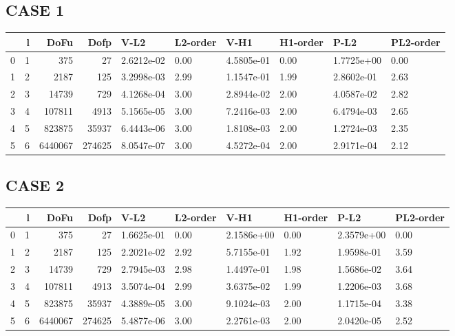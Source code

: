\documentclass[11pt]{article}
\numberwithin{equation}{section}    %
\begin{document}
\subsection*{CASE 1}

\begin{tabular}{lrrrllllll}
\hline
{} &  l &     DoFu &    Dofp &        V-L2 & L2-order &        V-H1 & H1-order &        P-L2 & PL2-order \\
\hline
\hline
0 &  1 &      375 &      27 &  2.6212e-02 &     0.00 &  4.5805e-01 &     0.00 &  1.7725e+00 &      0.00 \\
1 &  2 &     2187 &     125 &  3.2998e-03 &     2.99 &  1.1547e-01 &     1.99 &  2.8602e-01 &      2.63 \\
2 &  3 &    14739 &     729 &  4.1268e-04 &     3.00 &  2.8944e-02 &     2.00 &  4.0587e-02 &      2.82 \\
3 &  4 &   107811 &    4913 &  5.1565e-05 &     3.00 &  7.2416e-03 &     2.00 &  6.4794e-03 &      2.65 \\
4 &  5 &   823875 &   35937 &  6.4443e-06 &     3.00 &  1.8108e-03 &     2.00 &  1.2724e-03 &      2.35 \\
5 &  6 &  6440067 &  274625 &  8.0547e-07 &     3.00 &  4.5272e-04 &     2.00 &  2.9171e-04 &      2.12 \\
\hline
\end{tabular}




\subsection*{CASE 2}

\begin{tabular}{lrrrllllll}
\hline
{} &  l &     DoFu &    Dofp &        V-L2 & L2-order &        V-H1 & H1-order &        P-L2 & PL2-order \\
\hline
0 &  1 &      375 &      27 &  1.6625e-01 &     0.00 &  2.1586e+00 &     0.00 &  2.3579e+00 &      0.00 \\
1 &  2 &     2187 &     125 &  2.2021e-02 &     2.92 &  5.7155e-01 &     1.92 &  1.9598e-01 &      3.59 \\
2 &  3 &    14739 &     729 &  2.7945e-03 &     2.98 &  1.4497e-01 &     1.98 &  1.5686e-02 &      3.64 \\
3 &  4 &   107811 &    4913 &  3.5074e-04 &     2.99 &  3.6375e-02 &     1.99 &  1.2206e-03 &      3.68 \\
4 &  5 &   823875 &   35937 &  4.3889e-05 &     3.00 &  9.1024e-03 &     2.00 &  1.1715e-04 &      3.38 \\
5 &  6 &  6440067 &  274625 &  5.4877e-06 &     3.00 &  2.2761e-03 &     2.00 &  2.0420e-05 &      2.52 \\
\hline
\end{tabular}
\end{document}
